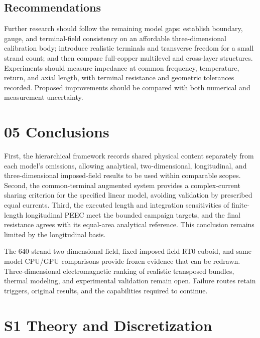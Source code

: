 \documentclass[11pt]{article}
\begin{document}
\subsection*{Recommendations}
\hypertarget{04.recommendations.heading}{}
Further research should follow the remaining model gaps: establish boundary, gauge, and terminal-field consistency on an affordable three-dimensional calibration body; introduce realistic terminals and transverse freedom for a small strand count; and then compare full-copper multilevel and cross-layer structures. Experiments should measure impedance at common frequency, temperature, return, and axial length, with terminal resistance and geometric tolerances recorded. Proposed improvements should be compared with both numerical and measurement uncertainty.


\FloatBarrier
\section*{05 Conclusions}
\hypertarget{chapter-05}{}
First, the hierarchical framework records shared physical content separately from each model’s omissions, allowing analytical, two-dimensional, longitudinal, and three-dimensional imposed-field results to be used within comparable scopes. Second, the common-terminal augmented system provides a complex-current sharing criterion for the specified linear model, avoiding validation by prescribed equal currents. Third, the executed length and integration sensitivities of finite-length longitudinal PEEC meet the bounded campaign targets, and the final resistance agrees with its equal-area analytical reference. This conclusion remains limited by the longitudinal basis.


The 640-strand two-dimensional field, fixed imposed-field RT0 cuboid, and same-model CPU/GPU comparisons provide frozen evidence that can be redrawn. Three-dimensional electromagnetic ranking of realistic transposed bundles, thermal modeling, and experimental validation remain open. Failure routes retain triggers, original results, and the capabilities required to continue.


\FloatBarrier
\section*{S1 Theory and Discretization}
\hypertarget{chapter-S1}{}
\end{document}
